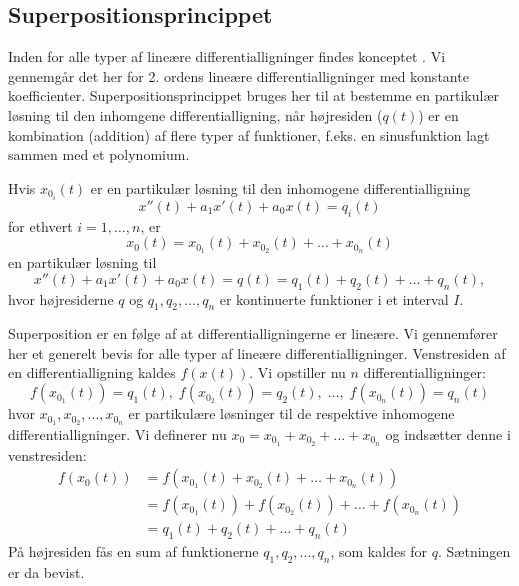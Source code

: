 \subsection{Superpositionsprincippet} \label{subsek.difflig2.super1}

Inden for alle typer af lineære differentialligninger findes konceptet . Vi gennemgår det her for 2. ordens lineære differentialligninger med konstante koefficienter. Superpositionsprincippet bruges her til at bestemme en partikulær løsning til den inhomgene differentialligning, når højresiden ($ q(t) $) er en kombination (addition) af flere typer af funktioner, f.eks. en sinusfunktion lagt sammen med et polynomium.

\begin{theorem}[Superpositionsprincippet] \label{saet.difflig2.super1}
Hvis $ x_{0_i}(t) $ er en partikulær løsning til den inhomogene differentialligning
\begin{equation}
x''(t) + a_1x'(t) + a_0x(t) = q_i(t)
\end{equation}
for ethvert $ i = 1,\ldots,n $, er 
\begin{equation}
x_0(t) = x_{0_1}(t) + x_{0_2}(t) + \ldots + x_{0_n}(t)
\end{equation}
en partikulær løsning til
\begin{equation}
x''(t) + a_1x'(t) + a_0x(t) = q(t) = q_1(t) + q_2(t) + \ldots + q_n(t),
\end{equation}
hvor højresiderne $ q $ og $ q_1, q_2, \ldots, q_n $ er kontinuerte funktioner i et interval $ I $. \bs
\end{theorem}

\begin{bevis} \label{bev.difflig2.super1}
Superposition er en følge af at differentialligningerne er lineære. Vi gennemfører her et generelt bevis for alle typer af lineære differentialligninger. \bs
Venstresiden af en differentialligning kaldes $ f(x(t)) $. Vi opstiller nu $ n $ differentialligninger:
\begin{equation}
f(x_{0_1}(t)) = q_1(t), \; f(x_{0_2}(t)) = q_2(t), \; \ldots, \; f(x_{0_n}(t)) = q_n(t)
\end{equation}
hvor $ x_{0_1}, x_{0_2}, \ldots, x_{0_n} $ er partikulære løsninger til de respektive inhomogene differentialligninger. Vi definerer nu $ x_{0} = x_{0_1} + x_{0_2} + \ldots + x_{0_n} $ og indsætter denne i venstresiden:
\begin{equation}
\begin{aligned}
f(x_{0}(t)) &= f(x_{0_1}(t) + x_{0_2}(t) + \ldots + x_{0_n}(t)) \\
&= f(x_{0_1}(t)) + f(x_{0_2}(t)) + \ldots + f(x_{0_n}(t)) \\
&= q_1(t) + q_2(t) + \ldots + q_n(t)
\end{aligned}
\end{equation}
På højresiden fås en sum af funktionerne $ q_1,q_2,\ldots,q_n $, som kaldes for $ q $. Sætningen er da bevist.
\end{bevis}

